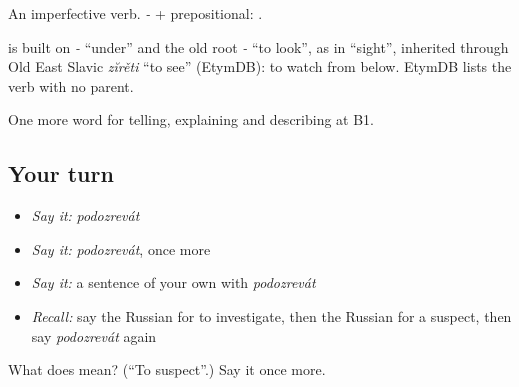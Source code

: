 An imperfective verb. \emph{ - } + prepositional: \emph{   }.

\begin{cousinweb}
\emph{} is built on \emph{-} \textquotedblleft{}under\textquotedblright{} and the old root \emph{-} \textquotedblleft{}to look\textquotedblright{}, as in \emph{} \textquotedblleft{}sight\textquotedblright{}, inherited through Old East Slavic \emph{zĭrěti} \textquotedblleft{}to see\textquotedblright{} (EtymDB): to watch from below. EtymDB lists the verb with no parent.
\end{cousinweb}

\begin{grammarlens}[title={What you've built}]
One more word for telling, explaining and describing at B1.
\end{grammarlens}

\subsection*{Your turn}
\begin{itemize}
\raggedright
  \item \emph{Say it:} \emph{podozrevát}
  \item \emph{Say it:} \emph{podozrevát}, once more
  \item \emph{Say it:} a sentence of your own with \emph{podozrevát}
  \item \emph{Recall:} say the Russian for to investigate, then the Russian for a suspect, then say \emph{podozrevát} again
\end{itemize}

\begin{tcolorbox}[breakable,colback=teal!4,colframe=teal!35!black,title={Before you move on}]
What does  mean? (\textquotedblleft{}To suspect\textquotedblright{}.) Say it once more.
\end{tcolorbox}
